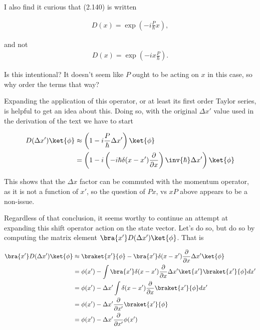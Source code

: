 I also find it curious that (2.140) is written

\begin{align*}
D(x) = \exp\left( -i \frac{P}{\hbar} x \right),
\end{align*}

and not
\begin{align*}
D(x) = \exp\left( -i x \frac{P}{\hbar} \right).
\end{align*}

Is this intentional?  It doesn't seem like $P$ ought to be acting on $x$ in this case, so why order the terms that way?

Expanding the application of this operator, or at least its first order Taylor series, is helpful to get an idea about this.  Doing so, with the original $\Delta x'$ value used in the derivation of the text we have to start

\begin{align*}
D(\Delta x') \ket{\phi} 
&\approx \left(1 - i \frac{P}{\hbar} \Delta x' \right) \ket{\phi} \\
&= \left(1 - i \left( -i \hbar \delta(x -x') \frac{\partial}{\partial x} \right) \inv{\hbar} \Delta x'\right) \ket{\phi} \\
\end{align*}

This shows that the $\Delta x$ factor can be commuted with the momentum operator, as it is not a function of $x'$, so the question of $P x$, vs $x P$ above appears to be a non-issue.

Regardless of that conclusion, it seems worthy to continue an attempt at expanding this shift operator action on the state vector.  Let's do so, but do so by computing the matrix element $\bra{x'} D(\Delta x') \ket{\phi}$.  That is

\begin{align*}
\bra{x'} D(\Delta x') \ket{\phi} 
&\approx
\braket{x'}{\phi} - \bra{x'} \delta(x -x') \frac{\partial}{\partial x} \Delta x' \ket{\phi} \\
&=
\phi(x') - \int \bra{x'} \delta(x -x') \frac{\partial}{\partial x} \Delta x' \ket{x'} \braket{x'}{\phi} dx' \\
&=
\phi(x') - \Delta x' \int \delta(x -x') \frac{\partial}{\partial x} \braket{x'}{\phi} dx' \\
&=
\phi(x') - \Delta x' \frac{\partial}{\partial x'} \braket{x'}{\phi} \\
&=
\phi(x') - \Delta x' \frac{\partial}{\partial x'} \phi(x') \\
\end{align*}

